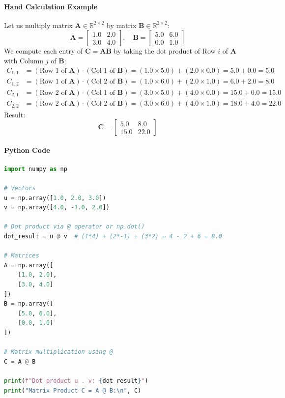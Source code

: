\paragraph{Hand Calculation Example}
Let us multiply matrix $\mathbf{A} \in \mathbb{R}^{2 \times 2}$ by matrix $\mathbf{B} \in \mathbb{R}^{2 \times 2}$:
\begin{equation*}
\mathbf{A} = \begin{bmatrix} 1.0 & 2.0 \\ 3.0 & 4.0 \end{bmatrix}, \quad
\mathbf{B} = \begin{bmatrix} 5.0 & 6.0 \\ 0.0 & 1.0 \end{bmatrix}
\end{equation*}
We compute each entry of $\mathbf{C} = \mathbf{A}\mathbf{B}$ by taking the dot product of Row $i$ of $\mathbf{A}$ with Column $j$ of $\mathbf{B}$:
\begin{align*}
C_{1,1} &= (\text{Row } 1 \text{ of } \mathbf{A}) \cdot (\text{Col } 1 \text{ of } \mathbf{B}) = (1.0 \times 5.0) + (2.0 \times 0.0) = 5.0 + 0.0 = 5.0 \\
C_{1,2} &= (\text{Row } 1 \text{ of } \mathbf{A}) \cdot (\text{Col } 2 \text{ of } \mathbf{B}) = (1.0 \times 6.0) + (2.0 \times 1.0) = 6.0 + 2.0 = 8.0 \\
C_{2,1} &= (\text{Row } 2 \text{ of } \mathbf{A}) \cdot (\text{Col } 1 \text{ of } \mathbf{B}) = (3.0 \times 5.0) + (4.0 \times 0.0) = 15.0 + 0.0 = 15.0 \\
C_{2,2} &= (\text{Row } 2 \text{ of } \mathbf{A}) \cdot (\text{Col } 2 \text{ of } \mathbf{B}) = (3.0 \times 6.0) + (4.0 \times 1.0) = 18.0 + 4.0 = 22.0
\end{align*}
Result:
\begin{equation*}
\mathbf{C} = \begin{bmatrix} 5.0 & 8.0 \\ 15.0 & 22.0 \end{bmatrix}
\end{equation*}

\paragraph{Python Code}
\begin{lstlisting}[language=Python]
import numpy as np

# Vectors
u = np.array([1.0, 2.0, 3.0])
v = np.array([4.0, -1.0, 2.0])

# Dot product via @ operator or np.dot()
dot_result = u @ v  # (1*4) + (2*-1) + (3*2) = 4 - 2 + 6 = 8.0

# Matrices
A = np.array([
    [1.0, 2.0],
    [3.0, 4.0]
])
B = np.array([
    [5.0, 6.0],
    [0.0, 1.0]
])

# Matrix multiplication using @
C = A @ B

print(f"Dot product u . v: {dot_result}")
print("Matrix Product C = A @ B:\n", C)
\end{lstlisting}

